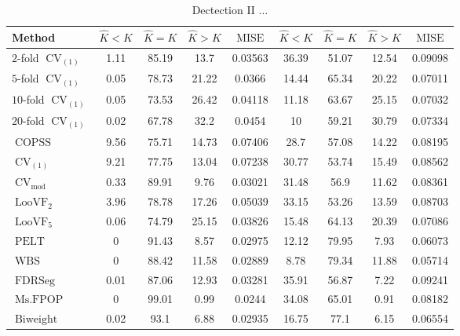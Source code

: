 \begin{table}[ht]
\centering
\begin{tabular}{|l|cccc|cccc|}
  \hline
Method & $\hat{K} < K$ & $\hat{K} = K$ & $\hat{K} > K$ & $\operatorname{MISE}$ & $\hat{K} < K$ & $\hat{K} = K$ & $\hat{K} > K$ & $\operatorname{MISE}$ \\ 
  \hline
$2$-fold $\operatorname{CV}_{(1)}$ &  1.11 & 85.19 &  13.7 & 0.03563 & 36.39 & 51.07 & 12.54 & 0.09098 \\ 
  $5$-fold $\operatorname{CV}_{(1)}$ &  0.05 & 78.73 & 21.22 & 0.0366 & 14.44 & 65.34 & 20.22 & 0.07011 \\ 
  $10$-fold $\operatorname{CV}_{(1)}$ &  0.05 & 73.53 & 26.42 & 0.04118 & 11.18 & 63.67 & 25.15 & 0.07032 \\ 
  $20$-fold $\operatorname{CV}_{(1)}$ &  0.02 & 67.78 &  32.2 & 0.0454 &    10 & 59.21 & 30.79 & 0.07334 \\ 
  $\operatorname{COPSS}$ &  9.56 & 75.71 & 14.73 & 0.07406 &  28.7 & 57.08 & 14.22 & 0.08195 \\ 
  $\operatorname{CV}_{(1)}$ &  9.21 & 77.75 & 13.04 & 0.07238 & 30.77 & 53.74 & 15.49 & 0.08562 \\ 
  $\operatorname{CV}_{\operatorname{mod}}$ &  0.33 & 89.91 &  9.76 & 0.03021 & 31.48 &  56.9 & 11.62 & 0.08361 \\ 
  $\operatorname{LooVF}_2$ &  3.96 & 78.78 & 17.26 & 0.05039 & 33.15 & 53.26 & 13.59 & 0.08703 \\ 
  $\operatorname{LooVF}_5$ &  0.06 & 74.79 & 25.15 & 0.03826 & 15.48 & 64.13 & 20.39 & 0.07086 \\ 
  $\operatorname{PELT}$ &     0 & 91.43 &  8.57 & 0.02975 & 12.12 & 79.95 &  7.93 & 0.06073 \\ 
  $\operatorname{WBS}$ &     0 & 88.42 & 11.58 & 0.02889 &  8.78 & 79.34 & 11.88 & 0.05714 \\ 
  $\operatorname{FDRSeg}$ &  0.01 & 87.06 & 12.93 & 0.03281 & 35.91 & 56.87 &  7.22 & 0.09241 \\ 
  $\operatorname{Ms.FPOP}$ &     0 & 99.01 &  0.99 & 0.0244 & 34.08 & 65.01 &  0.91 & 0.08182 \\ 
  $\operatorname{Biweight}$ &  0.02 &  93.1 &  6.88 & 0.02935 & 16.75 &  77.1 &  6.15 & 0.06554 \\ 
   \hline
\end{tabular}
\caption{Dectection II ...} 
\end{table}
